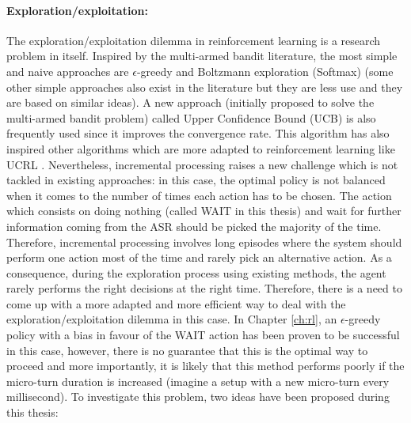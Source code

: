         \paragraph{Exploration/exploitation:} The exploration/exploitation dilemma in reinforcement learning is a research problem in itself. Inspired by the multi-armed bandit literature, the most simple and naive approaches are $\epsilon$-greedy and Boltzmann exploration (Softmax) \cite{Sutton1998} (some other simple approaches also exist in the literature but they are less use and they are based on similar ideas). A new approach (initially proposed to solve the multi-armed bandit problem) called Upper Confidence Bound (UCB) \cite{Auer2002} is also frequently used since it improves the convergence rate. This algorithm has also inspired other algorithms which are more adapted to reinforcement learning like UCRL \cite{Auer2006}. Nevertheless, incremental processing raises a new challenge which is not tackled in existing approaches: in this case, the optimal policy is not balanced when it comes to the number of times each action has to be chosen. The action which consists on doing nothing (called WAIT in this thesis) and wait for further information coming from the ASR should be picked the majority of the time. Therefore, incremental processing involves long episodes where the system should perform one action most of the time and rarely pick an alternative action. As a consequence, during the exploration process using existing methods, the agent rarely performs the right decisions at the right time. Therefore, there is a need to come up with a more adapted and more efficient way to deal with the exploration/exploitation dilemma in this case. In Chapter \ref{ch:rl}, an $\epsilon$-greedy policy with a bias in favour of the WAIT action has been proven to be successful in this case, however, there is no guarantee that this is the optimal way to proceed and more importantly, it is likely that this method performs poorly if the micro-turn duration is increased (imagine a setup with a new micro-turn every millisecond). To investigate this problem, two ideas have been proposed during this thesis:

